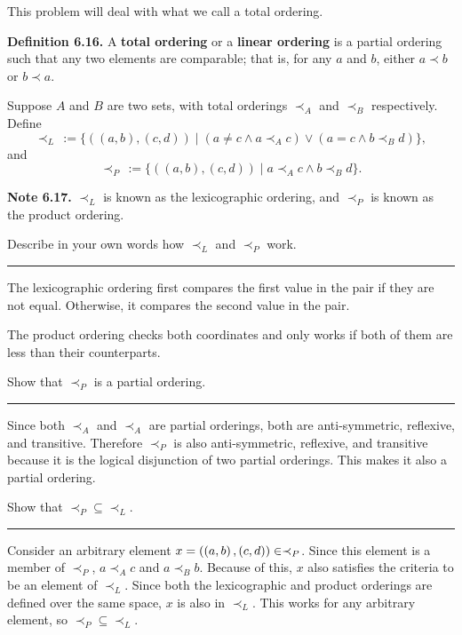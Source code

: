 \documentclass{article}
\begin{document}
\problem{}

This problem will deal with what we call a total ordering.


\textbf{Definition 6.16.}
A \textbf{total ordering} or a \textbf{linear ordering} is a partial ordering such that any two elements are comparable; that is, for any $a$ and $b$, either $a \prec b$ or $b \prec a$. 

Suppose $A$ and $B$ are two sets, with total orderings $\prec_A$ and $\prec_B$ respectively.
Define 
\[
    \prec_L\, := \{((a, b), (c, d)) \mid (a \neq c \land a \prec_A c) \lor (a = c \land b \prec_B d) \},
\]
and
\[
    \prec_P\, := \{((a, b), (c, d)) \mid a \prec_A c \land b \prec_B d \}.
\]

\textbf{Note 6.17.}
$\prec_L$ is known as the lexicographic ordering, and $\prec_P$ is known as the product ordering.

\subproblema{}
Describe in your own words how $\prec_L$ and $\prec_P$ work.
\hrule

The lexicographic ordering first compares the first value in the pair if they are not equal.
Otherwise, it compares the second value in the pair.

The product ordering checks both coordinates and only works if both of them are less than their counterparts.

\subproblema{}
Show that $\prec_P$ is a partial ordering.
\hrule

Since both $\prec_A$ and $\prec_A$ are partial orderings, both are anti-symmetric, reflexive, and transitive.
Therefore $\prec_P$ is also anti-symmetric, reflexive, and transitive because it is the logical disjunction of two partial orderings.
This makes it also a partial ordering.

\subproblema{}
Show that $\prec_P \subseteq \prec_L$.
\hrule

Consider an arbitrary element $x = \left (\left (a, b \right), \left (c, d \right) \right) \in \prec_P$.
Since this element is a member of $\prec_P$, $a \prec_A c$ and $a \prec_B b$.
Because of this, $x$ also satisfies the criteria to be an element of $\prec_L$.
Since both the lexicographic and product orderings are defined over the same space, $x$ is also in $\prec_L$.
This works for any arbitrary element, so $\prec_P \subseteq \prec_L$.
\end{document}

